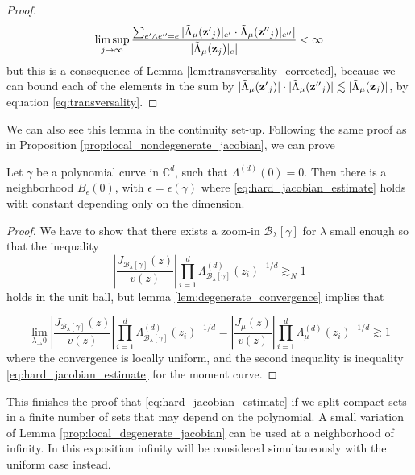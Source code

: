 \begin{proof}
	\begin{equation}
		\limsup_{j \to \infty }
		\frac 
		{ \sum_{e'\wedge e'' = e} |\tilde \Lambda_{\mu}({\bf z'}_j)|_{e'}
		\cdot
		\tilde \Lambda_{\mu}({\bf z''}_j)|_{e''}|} {|\tilde \Lambda_{\mu}({\bf z}_j)|_e|}<\infty
	\end{equation}
	but this is a consequence of Lemma \ref{lem:transversality_corrected}, because we can bound each of the elements in the sum by 
	$|\tilde \Lambda_{\mu}({\bf z'}_j)|
		\cdot
		|\tilde \Lambda_{\mu}({\bf z''}_j)| \lesssim {|\tilde \Lambda_{\mu}({\bf z}_j)|} $, by equation \eqref{eq:transversality}.


	\end{proof}


	We can also see this lemma in the continuity set-up. Following the same proof as in Proposition \ref{prop:local_nondegenerate_jacobian}, we can prove


	\begin{prop}
	\label{prop:local_degenerate_jacobian}
		Let $\gamma$ be a polynomial curve in $\mathbb C^d$, such that $\Lambda^{(d)}(0) = 0$. Then there is a neighborhood $B_\epsilon(0)$, with $\epsilon=\epsilon(\gamma)$ where \eqref{eq:hard_jacobian_estimate} holds with constant depending only on the dimension.
	\end{prop}

	\begin{proof}
		We have to show that there exists a zoom-in $\mathcal B_{\lambda}[\gamma]$ for $\lambda$ small enough so that the inequality 
		$$
		\left|\frac{J_{\mathcal B_{\lambda}[\gamma]}(z)}{v(z)}\right| \prod_{i=1}^d \Lambda^{(d)}_{\mathcal B_{\lambda}[\gamma]}(z_i)^{- 1/d} \gtrsim_N 1
		$$ holds in the unit ball, but lemma \ref{lem:degenerate_convergence} implies that

		$$
		\lim_{\lambda_\to 0}
		\left|\frac{J_{\mathcal B_{\lambda}[\gamma]}(z)}{v(z)}\right| \prod_{i=1}^d \Lambda^{(d)}_{\mathcal B_{\lambda}[\gamma]}(z_i)^{- 1/d} = 
		\left|\frac{J_{\mu}(z)}{v(z)}\right| \prod_{i=1}^d \Lambda^{(d)}_{\mu}(z_i)^{- 1/d} \gtrsim 1
		$$
		where the  convergence is locally uniform, and the second inequality is inequality \ref{eq:hard_jacobian_estimate} for the moment curve.

		
	\end{proof}

	This finishes the proof that \eqref{eq:hard_jacobian_estimate} if we split compact sets in a finite number of sets that may depend on the polynomial. A small variation of Lemma \ref{prop:local_degenerate_jacobian} can be used at a neighborhood of infinity. In this exposition infinity will be considered simultaneously with the uniform case instead.

